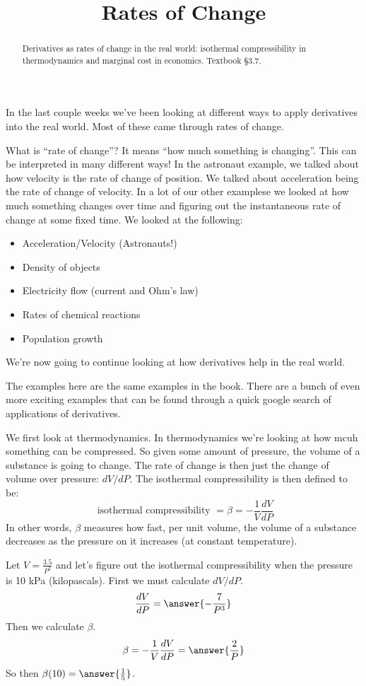 \documentclass{ximera}
\title{Rates of Change}
\begin{document}
\begin{abstract}
Derivatives as rates of change in the real world: isothermal compressibility in thermodynamics and marginal cost in economics. Textbook §3.7.
\end{abstract}
\maketitle

In the last couple weeks we've been looking at different ways to apply derivatives into the real world. Most of these came through rates of change.

What is ``rate of change''? It means ``how much something is changing''. This can be interpreted in many different ways! In the astronaut example, we talked about how velocity is the rate of change of position. We talked about acceleration being the rate of change of velocity. In a lot of our other examplese we looked at how much something changes over time and figuring out the instantaneous rate of change at some fixed time. We looked at the following:

\begin{itemize}
  \item Acceleration/Velocity (Astronauts!)
  \item Density of objects
  \item Electricity flow (current and Ohm's law)
  \item Rates of chemical reactions
  \item Population growth
\end{itemize}

We're now going to continue looking at how derivatives help in the real world.

\begin{warning}
The examples here are the same examples in the book. There are a bunch of even more exciting examples that can be found through a quick google search of applications of derivatives.
\end{warning}

\begin{example}\label{example:8-1}
We first look at thermodynamics. In thermodynamics we're looking at how mcuh something can be compressed. So given some amount of pressure, the volume of a substance is going to change. The rate of change is then just the change of volume over pressure: $d V / d P$. The isothermal compressibility is then defined to be:
\[
\text { isothermal compressibility }=\beta=-\frac{1}{V} \frac{d V}{d P}
\]
In other words, $\beta$ measures how fast, per unit volume, the volume of a substance decreases as the pressure on it increases (at constant temperature).

Let $V=\frac{3.5}{P^{2}}$ and let's figure out the isothermal compressibility when the pressure is 10 kPa (kilopascals). First we must calculate $d V / d P$.
\[
\frac{d V}{d P}=\answer{-\frac{7}{P^{3}}}
\]
Then we calculate $\beta$.
\[
\beta=-\frac{1}{V} \frac{d V}{d P}=\answer{\frac{2}{P}}
\]
So then $\beta(10)=\answer{\frac{1}{5}}$.
\end{example}
\end{document}
